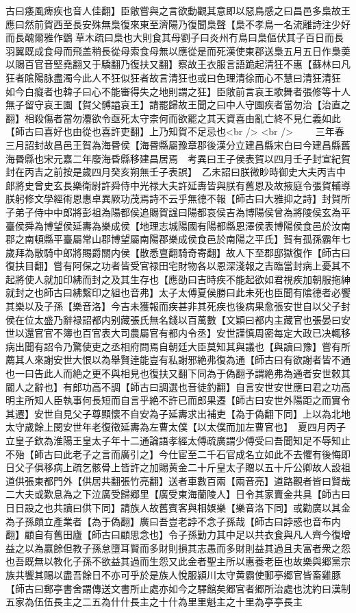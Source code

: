 古曰痿風痺疾也音人佳翻】臣敞嘗與之言欲動觀其意即以惡鳥感之曰昌邑多梟故王應曰然前賀西至長安殊無梟復來東至濟陽乃復聞梟聲【梟不孝鳥一名流離詩注少好而長醜爾雅作鶹草木疏曰梟也大則食其母劉子曰炎州冇鳥曰梟傴伏其子百日而長羽翼既成食母而飛盖稍長從母索食母無以應從是而死漢使東郡送梟五月五日作梟羮以賜百官音堅堯翻又于驕翻乃復扶又翻】察故王衣服言語跪起清狂不惠【蘇林曰凡狂者隂陽脉盡濁今此人不狂似狂者故言清狂也或曰色理清徐而心不慧曰清狂清狂　　如今白癡者也韓子曰心不能審得失之地則謂之狂】臣敞前言哀王歌舞者張修等十人無子留守哀王園【賀父髆謚哀王】請罷歸故王聞之曰中人守園疾者當勿治【治直之翻】相殺傷者當勿灋欲令亟死太守柰何而欲罷之其天資喜由亂亡終不見仁義如此【師古曰喜好也由從也喜許吏翻】上乃知賀不足忌也<br />
<br />
　　三年春三月詔封故昌邑王賀為海昬侯【海昬縣屬豫章郡後漢分立建昌縣宋白曰今建昌縣舊海昬縣也宋元嘉二年廢海昏縣移建昌居焉　考異曰王子侯表賀以四月壬子封宣紀賀封在丙吉之前按是歲四月癸亥朔無壬子表誤】　乙未詔曰朕微眇時御史大夫丙吉中郎將史曾史玄長樂衛尉許舜侍中光禄大夫許延夀皆與朕有舊恩及故掖庭令張賀輔導朕躬修文學經術恩惠卓異厥功茂焉詩不云乎無德不報【師古曰大雅抑之詩】封賀所子弟子侍中中郎將彭祖為陽都侯追賜賀諡曰陽都哀侯吉為博陽侯曾為將陵侯玄為平臺侯舜為博望侯延夀為樂成侯【地理志城陽國有陽都縣恩澤侯表博陽侯食邑於汝南郡之南頓縣平臺屬常山郡博望屬南陽郡樂成侯食邑於南陽之平氏】賀有孤孫霸年七歲拜為散騎中郎將賜爵關内侯【散悉亶翻騎奇寄翻】故人下至郡邸獄復作【師古曰復扶目翻】嘗有阿保之功者皆受官禄田宅財物各以恩深淺報之吉臨當封病上憂其不起將使人就加印紼而封之及其生存也【應劭曰吉時疾不能起欲如君視疾加朝服拖紳就封之也師古曰紼繫印之組也音弗】太子太傅夏侯勝曰此未死也臣聞有隂德者必饗其樂以及子孫【樂音洛】今吉未獲報而疾甚非其死疾也後病果愈張安世自以父子封侯在位太盛乃辭禄詔都内别藏張氏無名錢以百萬數【文穎曰都内主藏官也張晏曰安世以還官官不簿也百官表大司農屬官有都内令丞】安世謹慎周密每定大政已决輒移病出聞有詔令乃驚使吏之丞相府問焉自朝廷大臣莫知其與議也【與讀曰豫】嘗有所薦其人來謝安世大恨以為舉賢逹能豈有私謝邪絶弗復為通【師古曰有欲謝者皆不通也一曰告此人而絶之更不與相見也復扶又翻下同為于偽翻予謂絶弗為通者安世敕其閽人之辭也】有郎功高不調【師古曰調選也音徒釣翻】自言安世安世應曰君之功高明主所知人臣執事何長短而自言乎絶不許已而郎果遷【師古曰安世外陽距之而實令其遷】安世自見父子尊顯懷不自安為子延夀求出補吏【為于偽翻下同】上以為北地太守歲餘上閔安世年老復徵延夀為左曹太僕【以太僕而加左曹官也】　夏四月丙子立皇子欽為淮陽王皇太子年十二通論語孝經太傅疏廣謂少傅受曰吾聞知足不辱知止不殆【師古曰此老子之言而廣引之】今仕宦至二千石官成名立如此不去懼有後悔即日父子俱移病上疏乞骸骨上皆許之加賜黄金二十斤皇太子贈以五十斤公卿故人設祖道供張東都門外【供居共翻張竹亮翻】送者車數百兩【兩音亮】道路觀者皆曰賢哉二大夫或歎息為之下泣廣受歸郷里【廣受東海蘭陵人】日令其家賣金共具【師古曰日日設之也共讀曰供下同】請族人故舊賓客與相娛樂【樂音洛下同】或勸廣以其金為子孫頗立產業者【為于偽翻】廣曰吾豈老誖不念子孫哉【師古曰誖惑也音布内翻】顧自有舊田廬【師古曰顧思念也】令子孫勤力其中足以共衣食與凡人齊今復增益之以為贏餘但教子孫怠墮耳賢而多財則損其志愚而多財則益其過且夫富者衆之怨也吾既無以教化子孫不欲益其過而生怨又此金者聖主所以惠養老臣也故樂與郷黨宗族共饗其賜以盡吾餘日不亦可乎於是族人悅服潁川太守黄霸使郵亭郷官皆畜雞豚【師古曰郵亭書舍謂傳送文書所止處亦如今之驛館矣郷官者郷所治處也沈約曰漢制五家為伍伍長主之二五為什什長主之十什為里里魁主之十里為亭亭長主
